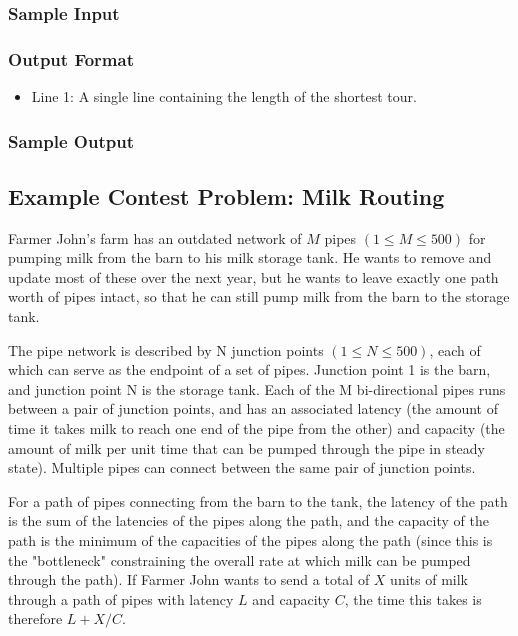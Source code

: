 \subsubsection{Sample Input}

\subsubsection{Output Format}
\begin{itemize}
	\item Line 1: A single line containing the length of the shortest tour. 
\end{itemize}

\subsubsection{Sample Output}

\subsection{Example Contest Problem: Milk Routing\cite{milkroute}}
Farmer John's farm has an outdated network of $M$ pipes $(1 \leq M \leq 500)$ for pumping milk from the barn to his milk storage tank.  
He wants to remove and update most of these over the next year, but he wants to leave exactly one path worth of pipes intact, 
so that he can still pump milk from the barn to the storage tank.

The pipe network is described by N junction points $(1 \leq N \leq 500)$, each of which can serve as the endpoint of a set of pipes.  
Junction point 1 is the barn, and junction point N is the storage tank.  
Each of the M bi-directional pipes runs between a pair of junction points, and has an associated latency 
(the amount of time it takes milk to reach one end of the pipe from the other) and capacity (the amount of milk per unit time
that can be pumped through the pipe in steady state).  
Multiple pipes can connect between the same pair of junction points.

For a path of pipes connecting from the barn to the tank, the latency of the path is the sum of the latencies of the pipes along 
the path, and the capacity of the path is the minimum of the capacities of the pipes along the path (since this is the "bottleneck" 
constraining the overall rate at which milk can be pumped through the path).  
If Farmer John wants to send a total of $X$ units of milk through a path of pipes with latency $L$ and capacity $C$, the time this takes is therefore $L + X/C$.

